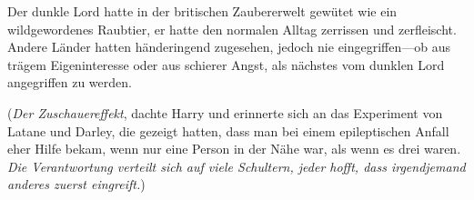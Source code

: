 Der dunkle Lord hatte in der britischen Zaubererwelt gewütet wie ein wildgewordenes Raubtier, er hatte den normalen Alltag zerrissen und zerfleischt. Andere Länder hatten händeringend zugesehen, jedoch nie eingegriffen—ob aus trägem Eigeninteresse oder aus schierer Angst, als nächstes vom dunklen Lord angegriffen zu werden.

(\emph{Der Zuschauereffekt}, dachte Harry und erinnerte sich an das Experiment von Latane und Darley, die gezeigt hatten, dass man bei einem epileptischen Anfall eher Hilfe bekam, wenn nur eine Person in der Nähe war, als wenn es drei waren. \emph{Die Verantwortung verteilt sich auf viele Schultern, jeder hofft, dass irgendjemand anderes zuerst eingreift.})

